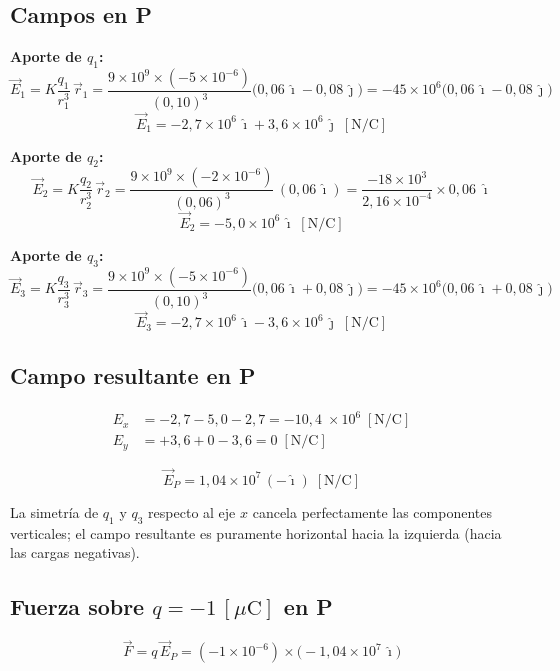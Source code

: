 \documentclass[12pt,letterpaper]{article}
\begin{document}
\subsection*{Campos en P}

\noindent\textbf{Aporte de $q_1$:}
\[
    \vec{E}_1 = K\frac{q_1}{r_1^3}\,\vec{r}_1
    = \frac{9\times10^9\times(-5\times10^{-6})}{(0{,}10)^3}
      \bigl(0{,}06\,\hat{\imath}-0{,}08\,\hat{\jmath}\bigr)
    = -45\times10^6\bigl(0{,}06\,\hat{\imath}-0{,}08\,\hat{\jmath}\bigr)
\]
\[
    \vec{E}_1 = -2{,}7\times10^6\,\hat{\imath} + 3{,}6\times10^6\,\hat{\jmath}
    \;[\text{N/C}]
\]

\noindent\textbf{Aporte de $q_2$:}
\[
    \vec{E}_2 = K\frac{q_2}{r_2^3}\,\vec{r}_2
    = \frac{9\times10^9\times(-2\times10^{-6})}{(0{,}06)^3}\,(0{,}06\,\hat{\imath})
    = \frac{-18\times10^3}{2{,}16\times10^{-4}}\times0{,}06\;\hat{\imath}
\]
\[
    \vec{E}_2 = -5{,}0\times10^6\,\hat{\imath}
    \;[\text{N/C}]
\]

\noindent\textbf{Aporte de $q_3$:}
\[
    \vec{E}_3 = K\frac{q_3}{r_3^3}\,\vec{r}_3
    = \frac{9\times10^9\times(-5\times10^{-6})}{(0{,}10)^3}
      \bigl(0{,}06\,\hat{\imath}+0{,}08\,\hat{\jmath}\bigr)
    = -45\times10^6\bigl(0{,}06\,\hat{\imath}+0{,}08\,\hat{\jmath}\bigr)
\]
\[
    \vec{E}_3 = -2{,}7\times10^6\,\hat{\imath} - 3{,}6\times10^6\,\hat{\jmath}
    \;[\text{N/C}]
\]

\subsection*{Campo resultante en P}

\begin{align*}
    E_x &= -2{,}7 - 5{,}0 - 2{,}7 = -10{,}4\;\times10^6\;[\text{N/C}]\\
    E_y &= +3{,}6 + 0 - 3{,}6 = 0\;[\text{N/C}]
\end{align*}

\[
    \boxed{\vec{E}_P = 1{,}04\times10^7\,(-\hat{\imath})\;[\text{N/C}]}
\]

La simetr\'ia de $q_1$ y $q_3$ respecto al eje $x$ cancela perfectamente las
componentes verticales; el campo resultante es puramente horizontal hacia la
izquierda (hacia las cargas negativas).

\subsection*{Fuerza sobre $q = -1\,[\mu\text{C}]$ en P}

\[
    \vec{F} = q\,\vec{E}_P
    = (-1\times10^{-6})\times\bigl(-1{,}04\times10^7\,\hat{\imath}\bigr)
\]
\end{document}
